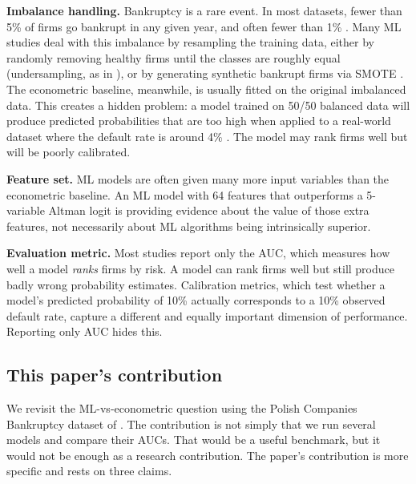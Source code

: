 \documentclass[12pt,a4paper]{article}
\begin{document}
\textbf{Imbalance handling.} Bankruptcy is a rare event. In most datasets,
fewer than 5\% of firms go bankrupt in any given year, and often fewer than
1\% \citep{shumway2001}. Many ML studies deal with this imbalance by
resampling the training data, either by randomly removing healthy firms
until the classes are roughly equal (undersampling, as in
\citealt{pellegrino2022}), or by generating synthetic bankrupt firms via
SMOTE \citep{chawla2002}. The econometric baseline, meanwhile, is usually
fitted on the original imbalanced data. This creates a hidden problem: a model trained on 50/50 balanced data will
produce predicted probabilities that are too high when applied to a real-world
dataset where the default rate is around 4\% \citep{king2001, saerens2002}.
The model may rank firms well but will be poorly calibrated.

\textbf{Feature set.} ML models are often given many more input variables
than the econometric baseline. An ML model with 64 features that outperforms
a 5-variable Altman logit is providing evidence about the value of those
extra features, not necessarily about ML algorithms being intrinsically
superior.

\textbf{Evaluation metric.} Most studies report only the AUC, which measures
how well a model \emph{ranks} firms by risk. A model can rank firms well but
still produce badly wrong probability estimates. Calibration metrics, which
test whether a model's predicted probability of 10\% actually corresponds to
a 10\% observed default rate, capture a different and equally important
dimension of performance. Reporting only AUC hides this.

\subsection{This paper's contribution}

We revisit the ML-vs-econometric question using the Polish Companies
Bankruptcy dataset of \cite{zieba2016}. The contribution is not simply that we
run several models and compare their AUCs. That would be a useful benchmark,
but it would not be enough as a research contribution. The paper's contribution
is more specific and rests on three claims.
\end{document}
